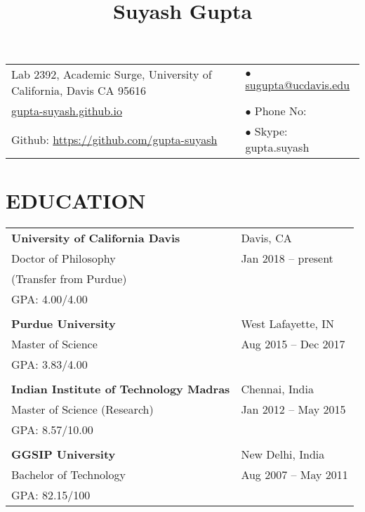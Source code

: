 \documentclass[10pt]{article}
\title{\vspace*{-2cm} \raggedright {\bf Suyash Gupta}}
\date{\vspace{-10ex}}	%
\begin{document}



\maketitle
{\hspace{-0.9cm}
\begin{tabular}{ll}
Lab 2392, Academic Surge, University of California, Davis CA 95616 	& $\bullet$ \href{mailto:sugupta@ucdavis.edu}{sugupta@ucdavis.edu} \\ 
\url{gupta-suyash.github.io} & $\bullet$ Phone No:\\
Github: \url{https://github.com/gupta-suyash}  		& $\bullet$ Skype: gupta.suyash \\
\end{tabular}\newline
}

\section*{EDUCATION}
{\setlength{\tabcolsep}{40pt}
\hspace{-1.5cm}
\begin{tabular}{ll}
{\bf University of California Davis} 		& Davis, CA 		\\
Doctor of Philosophy				& Jan 2018 -- present 	\\
(Transfer from Purdue)				&			\\
GPA: 4.00/4.00					&			\\
						&			\\
{\bf Purdue University} 			& West Lafayette, IN 	\\
Master of Science				& Aug 2015 -- Dec 2017 	\\
GPA: 3.83/4.00					&			\\
						&			\\
{\bf Indian Institute of Technology Madras}	& Chennai, India	\\
Master of Science (Research)			& Jan 2012 -- May 2015 	\\
GPA: 8.57/10.00					&			\\
						&			\\
{\bf GGSIP University}				& New Delhi, India	\\ 
Bachelor of Technology				& Aug 2007 -- May 2011	\\
GPA: 82.15/100					&			\\
\end{tabular}}
\end{document}
